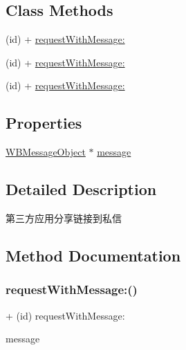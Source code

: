\subsection*{Class Methods}
\begin{DoxyCompactItemize}
\item 
(id) + \mbox{\hyperlink{interface_w_b_share_message_to_contact_request_a8ee52281e0f9bb9f8b006d298760c001}{request\+With\+Message\+:}}
\item 
(id) + \mbox{\hyperlink{interface_w_b_share_message_to_contact_request_a8ee52281e0f9bb9f8b006d298760c001}{request\+With\+Message\+:}}
\item 
(id) + \mbox{\hyperlink{interface_w_b_share_message_to_contact_request_a8ee52281e0f9bb9f8b006d298760c001}{request\+With\+Message\+:}}
\end{DoxyCompactItemize}
\subsection*{Properties}
\begin{DoxyCompactItemize}
\item 
\mbox{\hyperlink{interface_w_b_message_object}{W\+B\+Message\+Object}} $\ast$ \mbox{\hyperlink{interface_w_b_share_message_to_contact_request_afe9678dacdedf75e35379869a5a4c365}{message}}
\end{DoxyCompactItemize}


\subsection{Detailed Description}
第三方应用分享链接到私信 

\subsection{Method Documentation}
\mbox{\label{interface_w_b_share_message_to_contact_request_a8ee52281e0f9bb9f8b006d298760c001}} 
\subsubsection{\texorpdfstring{request\+With\+Message\+:()}{requestWithMessage:()}\hspace{0.1cm}{\footnotesize\ttfamily [1/3]}}
{\footnotesize\ttfamily + (id) request\+With\+Message\+: \begin{DoxyParamCaption}\item[{(\mbox{\hyperlink{interface_w_b_message_object}{W\+B\+Message\+Object}} $\ast$)}]{message }\end{DoxyParamCaption}}

